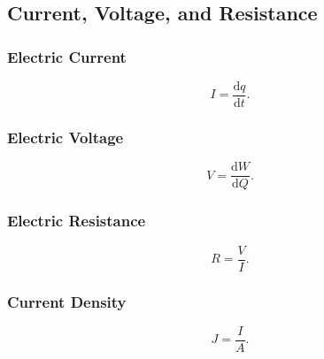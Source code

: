 
\subsection{Current, Voltage, and Resistance}

\subsubsection{Electric Current}
\begin{equation*}
  I = \frac{\mathrm{d}q}{\mathrm{d}t} 
.\end{equation*}

\begin{symbols}
\end{symbols}

\subsubsection{Electric Voltage}
\begin{equation*}
  V = \frac{\mathrm{d}W}{\mathrm{d}Q} 
.\end{equation*}

\begin{symbols}
\end{symbols}

\subsubsection{Electric Resistance}
\begin{equation*}
  R = \frac{V}{I}
.\end{equation*}

\begin{symbols}
\end{symbols}

\subsubsection{Current Density}
\begin{equation*}
  J = \frac{I}{A}
.\end{equation*}

\begin{symbols}
\end{symbols}

